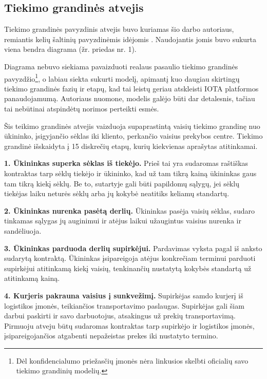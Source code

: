 \subsection{Tiekimo grandinės atvejis}

Tiekimo grandinės pavyzdinis atvejis buvo kuriamas šio darbo autoriaus, remiantis kelių šaltinių pavyzdinėmis idėjomis \cite{christopher2016logistics, webber2009building, patrick2017continuous, justin2016customer}. Naudojantis jomis buvo sukurta viena bendra diagrama (žr. priedas nr. 1). 

Diagrama nebuvo siekiama pavaizduoti realaus pasaulio tiekimo grandinės pavyzdžio\footnote{Dėl konfidencialumo priežasčių įmonės nėra linkusios skelbti oficialių savo tiekimo grandinių modelių.}, o labiau siekta sukurti modelį, apimantį kuo daugiau skirtingų tiekimo grandinės fazių ir etapų, kad tai leistų geriau atskleisti IOTA platformos panaudojamumą. Autoriaus nuomone, modelis galėjo būti dar detalesnis, tačiau tai nebūtinai atspindėtų norimos perteikti esmės.

Šis teikimo grandinės atvejis vaizduoja supaprastintą vaisių tiekimo grandinę nuo ūkininko, įsigyjančio sėklas iki kliento, perkančio vaisius prekybos centre. Tiekimo grandinė išskaidyta į 15 diskrečių etapų, kurių kiekvienas aprašytas atitinkamai.

\medskip \noindent \textbf{1. Ūkininkas superka sėklas iš tiekėjo.} Prieš tai yra sudaromas raštiškas kontraktas tarp sėklų tiekėjo ir ūkininko, kad už tam tikrą kainą ūkininkas gaus tam tikrą kiekį sėklų. Be to, sutartyje gali būti papildomų sąlygų, jei sėklų tiekėjas laiku neturės sėklų arba jų kokybė neatitiks keliamų standartų.

\medskip \noindent \textbf{2. Ūkininkas nurenka pasėtą derlių.} Ūkininkas pasėja vaisių sėklas, sudaro tinkamas sąlygas jų auginimui ir atėjus laikui užaugintus vaisius nurenka ir sandėliuoja. 

\medskip \noindent \textbf{3. Ūkininkas parduoda derlių supirkėjui.} Pardavimas vyksta pagal iš anksto sudarytą kontraktą. Ūkininkas įsipareigoja atėjus konkrečiam terminui parduoti supirkėjui atitinkamą kiekį vaisių, tenkinančių nustatytą kokybės standartą už atitinkamą kainą.

\medskip \noindent \textbf{4. Kurjeris pakrauna vaisius į sunkvežimį.} Supirkėjas samdo kurjerį iš logistikos įmonės, teikiančios transportavimo paslaugas. Supirkėjas gali šiam darbui paskirti ir savo darbuotojus, atsakingus už prekių transportavimą. Pirmuoju atveju būtų sudaromas kontraktas tarp supirkėjo ir logistikos įmonės, įsipareigojančios atgabenti nepažeistas prekes iki nustatyto termino.

